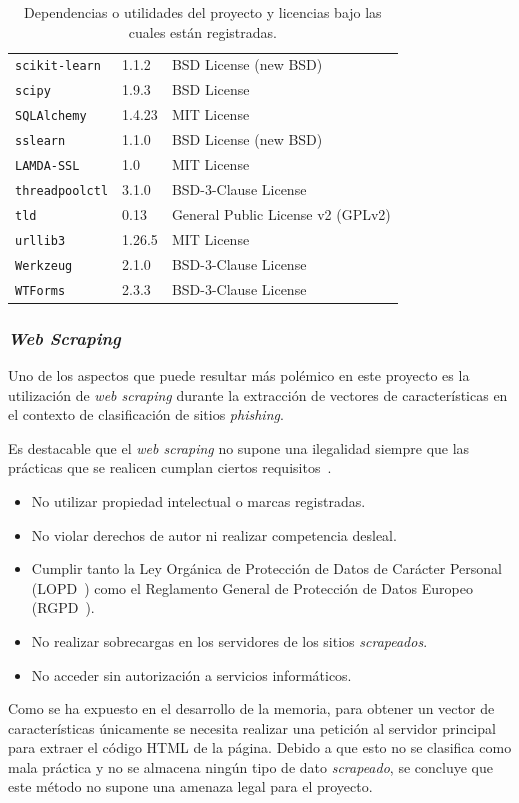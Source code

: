 \begin{table}[p]
\begin{tabularx}{\linewidth}{ p{} p{} p{} }
		\texttt{scikit-learn} & 1.1.2 & BSD License (new BSD)\\
		\texttt{scipy} & 1.9.3 & BSD License \\
		\texttt{SQLAlchemy} & 1.4.23 & MIT License \\
		\texttt{sslearn} & 1.1.0 & BSD License (new BSD) \\
		\texttt{LAMDA-SSL} & 1.0 & MIT License \\
		\texttt{threadpoolctl} & 3.1.0 & BSD-3-Clause License \\
		\texttt{tld} & 0.13 & General Public License v2 (GPLv2)\\
		\texttt{urllib3} & 1.26.5 & MIT License \\
		\texttt{Werkzeug} & 2.1.0 & BSD-3-Clause License \\
		\texttt{WTForms} & 2.3.3 & BSD-3-Clause License \\
		\bottomrule
	\end{tabularx}
	\caption[Licencias: dependencias o utilidades]{Dependencias o utilidades del proyecto y licencias bajo las cuales están registradas.}
	\label{a:licencias}
\end{table}


\subsubsection{\textit{Web Scraping}}

Uno de los aspectos que puede resultar más polémico en este proyecto es la utilización de \textit{web scraping} durante la extracción de vectores de características en el contexto de clasificación de sitios \textit{phishing}.

Es destacable que el \textit{web scraping} no supone una ilegalidad siempre que las prácticas que se realicen cumplan ciertos requisitos~\cite{legalidadWebScrapingI}.

\begin{itemize}
	\item No utilizar propiedad intelectual o marcas registradas.
	\item No violar derechos de autor ni realizar competencia desleal.
	\item Cumplir tanto la Ley Orgánica de Protección de Datos de Carácter Personal (LOPD~\cite{LOPD}) como el Reglamento General de Protección de Datos Europeo (RGPD~\cite{RGPD}).
	\item No realizar sobrecargas en los servidores de los sitios \textit{scrapeados}.
	\item No acceder sin autorización a servicios informáticos.
\end{itemize}

Como se ha expuesto en el desarrollo de la memoria, para obtener un vector de características únicamente se necesita realizar una petición al servidor principal para extraer el código HTML de la página. Debido a que esto no se clasifica como mala práctica y no se almacena ningún tipo de dato \textit{scrapeado}, se concluye que este método no supone una amenaza legal para el proyecto.
